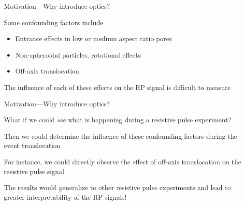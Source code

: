 

\begin{frame}[c]{Motivation---Why introduce optics?}
	

	
	Some confounding factors include
	
	\begin{itemize}
		\item Entrance effects in low or medium aspect ratio pores
		\item Non-spheroidal particles, rotational effects
		\item Off-axis translocation
	\end{itemize}
	
	The influence of each of these effects on the RP signal is difficult to measure

\end{frame}





\begin{frame}[c]{Motivation---Why introduce optics?}
	
	What if we could \textit{see} what is happening during a resistive pulse experiment? 
	
	\vspace{.2in}
	
	Then we could determine the influence of these confounding factors during the event translocation \\
	
	\vspace{.2in}
	
	For instance, we could directly observe the effect of off-axis translocation on the resistive pulse signal
	
	\vspace{.2in}
	
	The results would generalize to other resistive pulse experiments and lead to greater interpretability of the RP signals!  \\
	

\end{frame}


